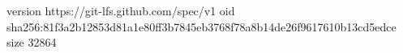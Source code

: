 version https://git-lfs.github.com/spec/v1
oid sha256:81f3a2b12853d81a1e80ff3b7845eb3768f78a8b14de26f9617610b13cd5edce
size 32864
